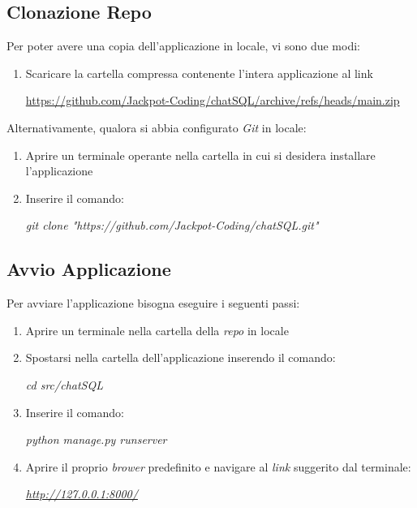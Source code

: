 \documentclass[5pt]{article}
\begin{document}
			
		\newpage
        \subsection{Clonazione Repo}
			Per poter avere una copia dell'applicazione in locale, vi sono due modi:
			\begin{enumerate}
				\item Scaricare la cartella compressa contenente l'intera applicazione al link
					\begin{center}
						\url{https://github.com/Jackpot-Coding/chatSQL/archive/refs/heads/main.zip}
					\end{center}
			\end{enumerate}
			Alternativamente, qualora si abbia configurato \textit{Git} in locale:
			\begin{enumerate}
				\item Aprire un terminale operante nella cartella in cui si desidera installare l'applicazione
				\item Inserire il comando:
					\begin{center}
						\textit{git clone "https://github.com/Jackpot-Coding/chatSQL.git"}
					\end{center}
			\end{enumerate}

		\subsection{Avvio Applicazione}
			Per avviare l'applicazione bisogna eseguire i seguenti passi:
			\begin{enumerate}
				\item Aprire un terminale nella cartella della \textit{repo} in locale
				\item Spostarsi nella cartella dell'applicazione inserendo il comando:
					\begin{center}
						\textit{cd src/chatSQL}
					\end{center}
				\item Inserire il comando:
					\begin{center}
						\textit{python manage.py runserver}
					\end{center}
				\item Aprire il proprio \textit{brower} predefinito e navigare al \textit{link} suggerito dal terminale:
					\begin{center}
						\textit{\url{http://127.0.0.1:8000/}}
					\end{center}
			\end{enumerate}
 
\end{document}
